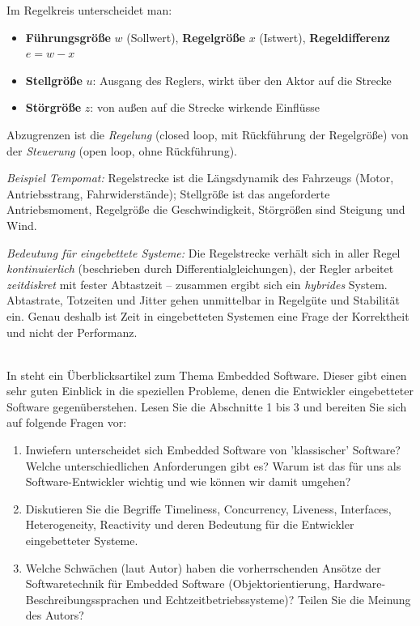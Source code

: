 \begin{loesung}
Im Regelkreis unterscheidet man:
\begin{itemize}
    \item \textbf{Führungsgröße} $w$ (Sollwert), \textbf{Regelgröße} $x$ (Istwert),
          \textbf{Regeldifferenz} $e = w - x$
    \item \textbf{Stellgröße} $u$: Ausgang des Reglers, wirkt über den Aktor auf die Strecke
    \item \textbf{Störgröße} $z$: von außen auf die Strecke wirkende Einflüsse
\end{itemize}
Abzugrenzen ist die \emph{Regelung} (closed loop, mit Rückführung der Regelgröße) von der
\emph{Steuerung} (open loop, ohne Rückführung).

\emph{Beispiel Tempomat:} Regelstrecke ist die Längsdynamik des Fahrzeugs (Motor, Antriebsstrang,
Fahrwiderstände); Stellgröße ist das angeforderte Antriebsmoment, Regelgröße die Geschwindigkeit,
Störgrößen sind Steigung und Wind.

\emph{Bedeutung für eingebettete Systeme:} Die Regelstrecke verhält sich in aller Regel
\emph{kontinuierlich} (beschrieben durch Differentialgleichungen), der Regler arbeitet
\emph{zeitdiskret} mit fester Abtastzeit -- zusammen ergibt sich ein \emph{hybrides} System.
Abtastrate, Totzeiten und Jitter gehen unmittelbar in Regelgüte und Stabilität ein. Genau deshalb
ist Zeit in eingebetteten Systemen eine Frage der Korrektheit und nicht der Performanz.
\end{loesung}

\\
In \cite{lee2002embedded} steht ein Überblicksartikel zum Thema Embedded Software. Dieser gibt einen sehr guten
Einblick in die speziellen Probleme, denen die Entwickler eingebetteter Software gegenüberstehen. Lesen Sie die Abschnitte 1 bis 3 und bereiten Sie sich auf folgende Fragen
vor:
\begin{enumerate}
    \item Inwiefern unterscheidet sich Embedded Software von ’klassischer’ Software? Welche unterschiedlichen Anforderungen gibt es? Warum ist das für uns als Software-Entwickler wichtig und wie können wir damit umgehen?
    \item Diskutieren Sie die Begriffe Timeliness, Concurrency, Liveness, Interfaces, Heterogeneity, Reactivity und deren Bedeutung für die Entwickler eingebetteter Systeme.
    \item Welche Schwächen (laut Autor) haben die vorherrschenden Ansötze der Softwaretechnik für Embedded Software (Objektorientierung, Hardware-Beschreibungssprachen und Echtzeitbetriebssysteme)? Teilen Sie die Meinung des Autors?
\end{enumerate}

